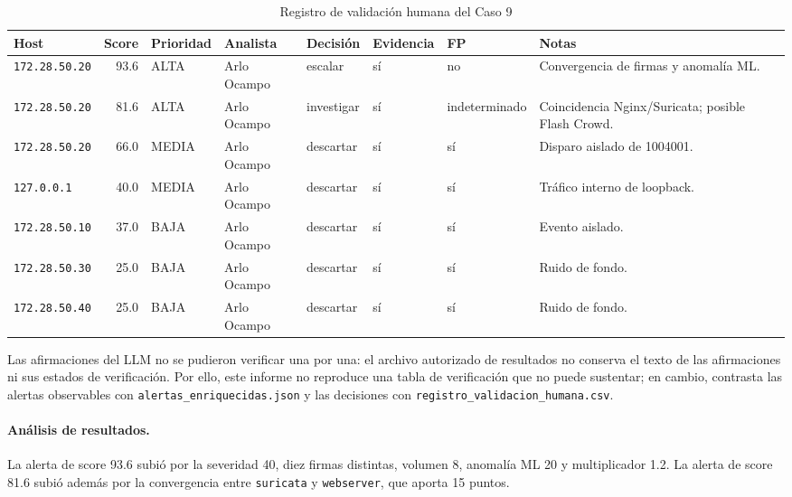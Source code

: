 \begin{table}[H]
\caption{Registro de validación humana del Caso 9}
\label{tab:c9_validacion}
\centering
\footnotesize
\renewcommand{\arraystretch}{1.15}
\begin{tabularx}{\textwidth}{@{}l r l l l l l X@{}}
\toprule
\textbf{Host} & \textbf{Score} & \textbf{Prioridad} & \textbf{Analista} & \textbf{Decisión} & \textbf{Evidencia} & \textbf{FP} & \textbf{Notas} \\
\midrule
\texttt{172.28.50.20} & 93.6 & ALTA & Arlo Ocampo & escalar & sí & no & Convergencia de firmas y anomalía ML. \\
\texttt{172.28.50.20} & 81.6 & ALTA & Arlo Ocampo & investigar & sí & indeterminado & Coincidencia Nginx/Suricata; posible Flash Crowd. \\
\texttt{172.28.50.20} & 66.0 & MEDIA & Arlo Ocampo & descartar & sí & sí & Disparo aislado de 1004001. \\
\texttt{127.0.0.1} & 40.0 & MEDIA & Arlo Ocampo & descartar & sí & sí & Tráfico interno de loopback. \\
\texttt{172.28.50.10} & 37.0 & BAJA & Arlo Ocampo & descartar & sí & sí & Evento aislado. \\
\texttt{172.28.50.30} & 25.0 & BAJA & Arlo Ocampo & descartar & sí & sí & Ruido de fondo. \\
\texttt{172.28.50.40} & 25.0 & BAJA & Arlo Ocampo & descartar & sí & sí & Ruido de fondo. \\
\bottomrule
\end{tabularx}
\end{table}

Las afirmaciones del LLM no se pudieron verificar una por una: el archivo autorizado de resultados no conserva el texto de las afirmaciones ni sus estados de verificación. Por ello, este informe no reproduce una tabla de verificación que no puede sustentar; en cambio, contrasta las alertas observables con \texttt{alertas\_enriquecidas.json} y las decisiones con \texttt{registro\_validacion\_humana.csv}.

\paragraph{Análisis de resultados.}
La alerta de score 93.6 subió por la severidad 40, diez firmas distintas, volumen 8, anomalía ML 20 y multiplicador 1.2. La alerta de score 81.6 subió además por la convergencia entre \texttt{suricata} y \texttt{webserver}, que aporta 15 puntos.

